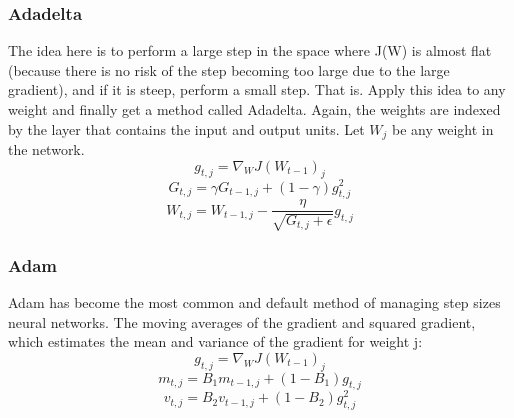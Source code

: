 \subsubsection{Adadelta}
The idea here is to perform a large step in  the space where J(W) is almost flat (because there is no risk of the step becoming too large due to the large gradient), and if it is steep, perform a small step. That is. Apply this idea to any weight and finally get a method called Adadelta. 
 Again, the weights are indexed by the layer that contains the input and output units. Let $W_j$ be any weight in the network.\\
\begin{equation*}
    g_{t,j} = \nabla_W J (W_{t-1})_j
\end{equation*}
\begin{equation*}
       G_{t,j }= \gamma G_{t-1, j} + (1-\gamma) g_{t,j}^2
\end{equation*}
\begin{equation*}
    W_{t,j} = W_{t-1,j}- \frac{\eta}{\sqrt{G_{t,j}+\epsilon}}g_{t,j}
\end{equation*}

\subsubsection{Adam}

Adam has become the most common and default method of managing step sizes neural networks. The moving averages of the gradient
and squared gradient, which estimates the mean and variance of the gradient for weight j:
\begin{equation*}
     g_{t,j} = \nabla_W J (W_{t-1})_j
\end{equation*}
\begin{equation*}
        m_{t,j} = B_1 m_{t-1,j} + (1-B_1) g_{t,j}
\end{equation*}
\begin{equation*}
        v_{t,j} = B_2 v_{t-1,j} + (1-B_2) g_{t,j}^2
\end{equation*}

